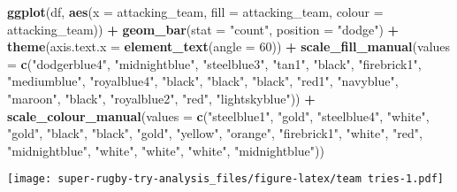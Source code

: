 \documentclass[
]{article}
\newenvironment{Shaded}{\begin{snugshade}}{\end{snugshade}}
\newcommand{\DataTypeTok}[1]{\textcolor[rgb]{0.13,0.29,0.53}{#1}}
\newcommand{\DecValTok}[1]{\textcolor[rgb]{0.00,0.00,0.81}{#1}}
\newcommand{\KeywordTok}[1]{\textcolor[rgb]{0.13,0.29,0.53}{\textbf{#1}}}
\newcommand{\NormalTok}[1]{#1}
\newcommand{\OperatorTok}[1]{\textcolor[rgb]{0.81,0.36,0.00}{\textbf{#1}}}
\newcommand{\StringTok}[1]{\textcolor[rgb]{0.31,0.60,0.02}{#1}}
\begin{document}
\begin{Shaded}
\begin{Highlighting}[]
\KeywordTok{ggplot}\NormalTok{(df, }\KeywordTok{aes}\NormalTok{(}\DataTypeTok{x =}\NormalTok{ attacking_team, }\DataTypeTok{fill =}\NormalTok{ attacking_team, }\DataTypeTok{colour =}\NormalTok{ attacking_team)) }\OperatorTok{+}
\StringTok{    }\KeywordTok{geom_bar}\NormalTok{(}\DataTypeTok{stat =} \StringTok{"count"}\NormalTok{, }\DataTypeTok{position =} \StringTok{"dodge"}\NormalTok{) }\OperatorTok{+}\StringTok{ }
\StringTok{    }\KeywordTok{theme}\NormalTok{(}\DataTypeTok{axis.text.x =} \KeywordTok{element_text}\NormalTok{(}\DataTypeTok{angle =} \DecValTok{60}\NormalTok{)) }\OperatorTok{+}
\StringTok{    }\KeywordTok{scale_fill_manual}\NormalTok{(}\DataTypeTok{values =} \KeywordTok{c}\NormalTok{(}\StringTok{"dodgerblue4"}\NormalTok{, }\StringTok{"midnightblue"}\NormalTok{, }\StringTok{"steelblue3"}\NormalTok{, }\StringTok{"tan1"}\NormalTok{, }\StringTok{"black"}\NormalTok{, }\StringTok{"firebrick1"}\NormalTok{, }\StringTok{"mediumblue"}\NormalTok{, }\StringTok{"royalblue4"}\NormalTok{, }\StringTok{"black"}\NormalTok{, }\StringTok{"black"}\NormalTok{, }\StringTok{"black"}\NormalTok{, }\StringTok{"red1"}\NormalTok{, }\StringTok{"navyblue"}\NormalTok{, }\StringTok{"maroon"}\NormalTok{, }\StringTok{"black"}\NormalTok{, }\StringTok{"royalblue2"}\NormalTok{, }\StringTok{"red"}\NormalTok{, }\StringTok{"lightskyblue"}\NormalTok{)) }\OperatorTok{+}
\StringTok{    }\KeywordTok{scale_colour_manual}\NormalTok{(}\DataTypeTok{values =} \KeywordTok{c}\NormalTok{(}\StringTok{"steelblue1"}\NormalTok{, }\StringTok{"gold"}\NormalTok{, }\StringTok{"steelblue4"}\NormalTok{, }\StringTok{"white"}\NormalTok{, }\StringTok{"gold"}\NormalTok{, }\StringTok{"black"}\NormalTok{, }\StringTok{"black"}\NormalTok{, }\StringTok{"gold"}\NormalTok{, }\StringTok{"yellow"}\NormalTok{, }\StringTok{"orange"}\NormalTok{, }\StringTok{"firebrick1"}\NormalTok{, }\StringTok{"white"}\NormalTok{, }\StringTok{"red"}\NormalTok{, }\StringTok{"midnightblue"}\NormalTok{, }\StringTok{"white"}\NormalTok{, }\StringTok{"white"}\NormalTok{, }\StringTok{"white"}\NormalTok{, }\StringTok{"midnightblue"}\NormalTok{))}
\end{Highlighting}
\end{Shaded}

\texttt{[image: super-rugby-try-analysis\_files/figure-latex/team tries-1.pdf]}
\end{document}
